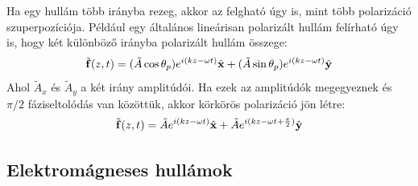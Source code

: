 \documentclass[../main.tex]{subfiles}
\begin{document}
Ha egy hullám több irányba rezeg, akkor az felgható úgy is, mint több polarizáció szuperpozíciója. Például egy általános lineárisan polarizált hullám felírható úgy is, hogy két különböző irányba polarizált hullám összege:
\begin{equation}
    \tilde{\bold{f}}(z, t) = (\tilde{A} \cos \theta_p) e^{i(kz - \omega t)}\hat{\bold{x}} + (\tilde{A} \sin \theta_p) e^{i(kz - \omega t)}\hat{\bold{y}}
\end{equation}
Ahol $\tilde{A}_x$ és $\tilde{A}_y$ a két irány amplitúdói. Ha ezek az amplitúdók megegyeznek és $\pi/2$ fáziseltolódás van közöttük, akkor körkörös polarizáció jön létre:
\begin{equation}
    \tilde{\bold{f}}(z, t) = \tilde{A} e^{i(kz - \omega t)}\hat{\bold{x}} + \tilde{A} e^{i(kz - \omega t + \frac{\pi}{2})}\hat{\bold{y}}
\end{equation}

\subsection{Elektromágneses hullámok}
\end{document}
